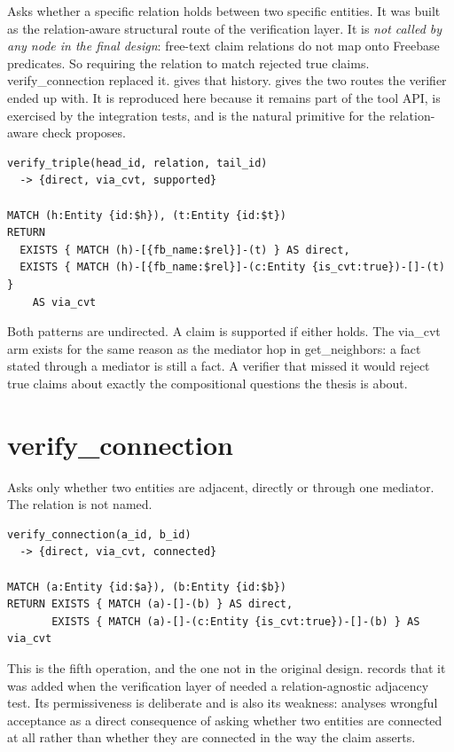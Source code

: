 Asks whether a specific relation holds between two specific entities. It was
built as the relation-aware structural route of the verification layer. It
is \emph{not called by any node in the final design}: free-text claim relations
do not map onto Freebase predicates. So requiring the relation to match rejected
true claims. \textsf{verify\_connection} replaced it.
 gives that history. 
gives the two routes the verifier ended up with. It is reproduced here because
it remains part of the tool API, is exercised by the integration tests, and is
the natural primitive for the relation-aware check  proposes.

\begin{lstlisting}[style=verbatimblock]
verify_triple(head_id, relation, tail_id)
  -> {direct, via_cvt, supported}

MATCH (h:Entity {id:$h}), (t:Entity {id:$t})
RETURN
  EXISTS { MATCH (h)-[{fb_name:$rel}]-(t) } AS direct,
  EXISTS { MATCH (h)-[{fb_name:$rel}]-(c:Entity {is_cvt:true})-[]-(t) }
    AS via_cvt
\end{lstlisting}

Both patterns are undirected. A claim is supported if either holds. The
\textsf{via\_cvt} arm exists for the same reason as the mediator hop in
\textsf{get\_neighbors}: a fact stated through a mediator is still a fact. A
verifier that missed it would reject true claims about exactly the compositional
questions the thesis is about.

\section{verify\_connection}\label{app:tool-verify-connection}

Asks only whether two entities are adjacent, directly or through one mediator.
The relation is not named.

\begin{lstlisting}[style=verbatimblock]
verify_connection(a_id, b_id)
  -> {direct, via_cvt, connected}

MATCH (a:Entity {id:$a}), (b:Entity {id:$b})
RETURN EXISTS { MATCH (a)-[]-(b) } AS direct,
       EXISTS { MATCH (a)-[]-(c:Entity {is_cvt:true})-[]-(b) } AS via_cvt
\end{lstlisting}

This is the fifth operation, and the one not in the original design.
 records that it was added when the verification layer of
 needed a relation-agnostic adjacency test. Its
permissiveness is deliberate and is also its weakness:
 analyses wrongful acceptance as a direct
consequence of asking whether two entities are connected at all rather than
whether they are connected in the way the claim asserts.

\endinput
